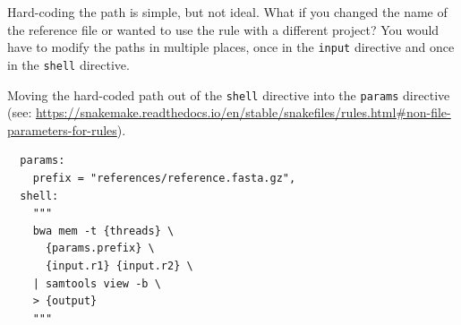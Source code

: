 \begin{questions}

Hard-coding the path is simple, but not ideal. What if you changed the name of the reference file or wanted to use the rule with a
different project? You would have to modify the paths in multiple places, once in the \texttt{input} directive and once in the
\texttt{shell} directive.

Moving the hard-coded path out of the \texttt{shell} directive into the \texttt{params} directive
(see: \url{https://snakemake.readthedocs.io/en/stable/snakefiles/rules.html#non-file-parameters-for-rules}).

\begin{answer}

\begin{lstlisting}
  params:
    prefix = "references/reference.fasta.gz",
  shell:
    """
    bwa mem -t {threads} \
      {params.prefix} \
      {input.r1} {input.r2} \
    | samtools view -b \
    > {output}
    """
\end{lstlisting}

\end{answer}

\end{questions}

